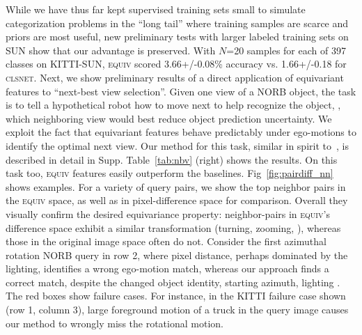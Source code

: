 \documentclass[10pt,twocolumn,letterpaper]{article}
\newcommand{\newchanges}{}
\newcommand{\changes}{}
\begin{document}
\newchanges{While we have thus far kept supervised training sets small to simulate categorization problems in the ``long tail'' where training samples are scarce and priors are most useful, new preliminary tests with larger labeled training sets on SUN show that our advantage is preserved. With $N$=20 samples for each of 397 classes on KITTI-SUN, \textsc{equiv} scored 3.66+/-0.08\% accuracy vs. 1.66+/-0.18 for \textsc{clsnet}.}%
Next, we show preliminary results of a direct application of equivariant features to ``next-best view selection''. Given one view of a NORB object, the task is to tell a hypothetical robot how to move next to help recognize the object, \ie, which neighboring view would best reduce object prediction uncertainty. We exploit the fact that equivariant features behave predictably under ego-motions to identify the optimal next view. Our method for this task, similar in \changes{spirit} to~\cite{wu20143d}, is described in detail in Supp. Table~\ref{tab:nbv} (right) shows the results. On this task too, \textsc{equiv} features easily outperform the baselines.
Fig~\ref{fig:pairdiff_nn} shows examples.  For a variety of query pairs, we show the top neighbor pairs in the \textsc{equiv} space, as well as in pixel-difference space for comparison.  Overall they visually confirm the desired equivariance property: neighbor-pairs in \textsc{equiv}'s difference space exhibit a similar transformation (turning, zooming, \etc), whereas those in the original image space often do not. Consider the first azimuthal rotation NORB query in row 2, where pixel distance, perhaps dominated by the lighting, identifies a wrong ego-motion match, whereas our approach finds a correct match, despite the changed object identity, starting azimuth, lighting \etc. The red boxes show failure cases. For instance, in the KITTI failure case shown (row 1, column 3), large foreground motion of a truck in the query image causes our method to wrongly miss the rotational motion.
\end{document}
